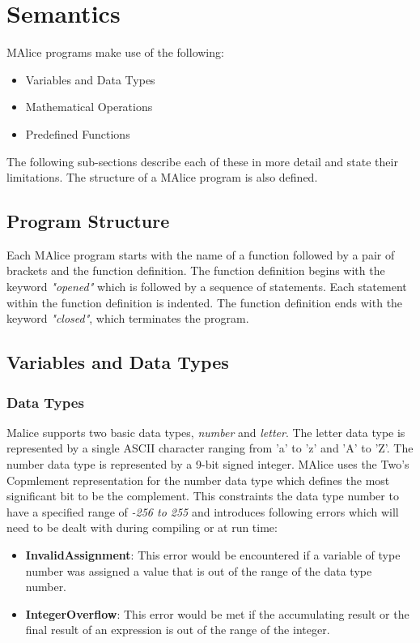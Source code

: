 \documentclass[a4wide, 11pt]{article}
\begin{document}
\section{Semantics}
\label{sec:semantics}
	MAlice programs make use of the following:
	\begin{itemize}
		\item Variables and Data Types
		\item Mathematical Operations 
		\item Predefined Functions  
	\end{itemize}
	The following sub-sections describe each of these in more detail and state their limitations.
	The structure of a MAlice program is also defined.

	\subsection{Program Structure}
	\label{sec:progStr}
		Each MAlice program starts with the name of a function followed by a pair of brackets and the function definition. 
		The function definition begins with the keyword \emph{"opened"} which is followed by a sequence of statements. Each statement 
		within the function definition is indented. The function definition ends with the keyword \emph{"closed"}, which terminates the program.

	\subsection{Variables and Data Types}
	\label{sec:vardtypes}

	\subsubsection{Data Types}
	\label{sec:dtypes}		
		Malice supports two basic data types, \emph{number} and \emph{letter}. The letter 
		data type is represented by a single ASCII character ranging from 'a' to 'z' and 
		'A' to 'Z'. The number data type is represented by a 9-bit signed integer. MAlice uses the 
		Two's Copmlement representation for the number data type which defines
		the most significant bit to be the complement. This constraints the data type number 
		to have a specified range of \emph{-256 to 255} and introduces following errors which 
		will need to be dealt with during compiling or at run time: 

			\begin{itemize}
				\item {\bf InvalidAssignment}: This error would be encountered if a 
							variable of type number was assigned a value that is 
							out of the range of the data type number. 
				\item {\bf IntegerOverflow}: This error would be met if the accumulating result or the final result
							of an expression is out of the range of the integer. 
			\end{itemize}
	
\end{document}
